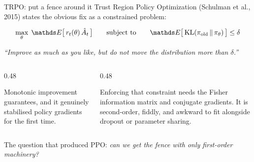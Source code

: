 \documentclass[aspectratio=169]{beamer}
\begin{document}
\begin{frame}{TRPO: put a fence around it}
  \small
  Trust Region Policy Optimization (Schulman et al., 2015) states the obvious fix as a
  constrained problem:

  \vskip 4pt
  \begin{center}
  \begin{tcolorbox}[colback=armblue!8, colframe=armblue, boxrule=0.7pt, arc=2pt, width=0.8\textwidth]
    \[ \max_\theta\; \E\big[\, r_t(\theta)\, \hat{A}_t \,\big]
       \qquad \text{subject to} \qquad \E\big[\, \mathrm{KL}(\pi_{\text{old}} \,\|\, \pi_\theta) \,\big] \le \delta \]
  \end{tcolorbox}
  \end{center}

  \vskip 6pt
  \begin{center}
    \small
    \emph{``Improve as much as you like, but do not move the distribution more than $\delta$.''}
  \end{center}

  \vskip 8pt
  \begin{columns}[T]
    \begin{column}{0.48\textwidth}
      \begin{tcolorbox}[colback=paramgreen!8, colframe=paramgreen, boxrule=0.6pt, arc=2pt,
                        title={\textbf{What it gets right}}]
        \small
        Monotonic improvement guarantees, and it genuinely stabilised policy gradients for the
        first time.
      \end{tcolorbox}
    \end{column}
    \begin{column}{0.48\textwidth}
      \begin{tcolorbox}[colback=armred!8, colframe=armred, boxrule=0.6pt, arc=2pt,
                        title={\textbf{Why nobody uses it}}]
        \small
        Enforcing that constraint needs the Fisher information matrix and conjugate gradients.
        It is second-order, fiddly, and awkward to fit alongside dropout or parameter sharing.
      \end{tcolorbox}
    \end{column}
  \end{columns}

  \vskip 8pt
  \begin{center}
    \small
    The question that produced PPO: \emph{can we get the fence with only first-order machinery?}
  \end{center}
\end{frame}
\end{document}
